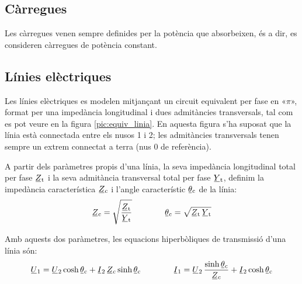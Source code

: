 \subsection{Càrregues}

Les càrregues venen sempre definides per la potència que absorbeixen, és a dir, es consideren càrregues de potència constant.

\subsection{Línies elèctriques} 

Les línies elèctriques es modelen mitjançant un circuit equivalent
per fase en «$\pi$», format per una impedància longitudinal i dues
admitàncies transversals, tal com es pot veure en la figura
\vref{pic:equiv_linia}. En aquesta figura s'ha suposat que la línia
està connectada entre els nusos 1 i 2; les admitàncies transversals
tenen sempre un extrem connectat a terra (nus 0 de referència).

\begin{center}
    
    \label{pic:equiv_linia}
\end{center}

A partir dels paràmetres propis d'una línia, la seva impedància
longitudinal  total per fase $\cmplx{Z}\ped{t}$ i la seva admitància
transversal total per fase $\cmplx{Y}\ped{t}$, definim la impedància
característica $\cmplx{Z}\ped{c}$ i l'angle característic
$\cmplx{\theta}\ped{c}$ de la línia:   
\begin{equation}
   \cmplx{Z}\ped{c} = \sqrt{\frac{\cmplx{Z}\ped{t}}{\cmplx{Y}\ped{t}}} \qquad \qquad
   \cmplx{\theta}\ped{c} = \sqrt{\cmplx{Z}\ped{t} \,\cmplx{Y}\ped{t} }
\end{equation}

Amb aquests dos paràmetres, les equacions hiperbòliques de
transmissió d'una línia són: 
\begin{equation}\label{eq:linia_eq_trans}
   \cmplx{U}_1 = \cmplx{U}_2 \cosh \cmplx{\theta}\ped{c}  + \cmplx{I}_2 \,\cmplx{Z}\ped{c} \sinh \cmplx{\theta}\ped{c}   \qquad \qquad
   \cmplx{I}_1 = \cmplx{U}_2 \, \frac{\sinh \cmplx{\theta}\ped{c}}{\cmplx{Z}\ped{c}}  +   \cmplx{I}_2 \cosh \cmplx{\theta}\ped{c}
\end{equation}


